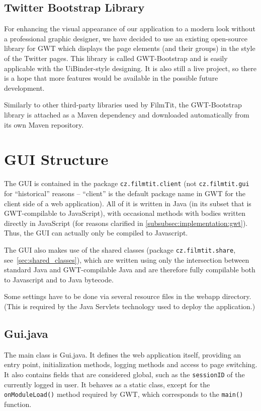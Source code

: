 \subsection{Twitter Bootstrap Library}
For enhancing the visual appearance of our application to a modern look without a professional graphic designer, we have decided to use an existing open-source library for GWT which displays the page elements (and their groups) in the style of the Twitter pages. This library is called GWT-Bootstrap and is easily applicable with the UiBinder-style designing. It is also still a live project, so there is a hope that more features would be available in the possible future development.

Similarly to other third-party libraries used by FilmTit, the GWT-Bootstrap library is attached as a Maven dependency and downloaded automatically from its own Maven repository.


\section{GUI Structure}

The GUI is contained in the package {\tt cz.filmtit.client} (not {\tt cz.filmtit.gui} for ``historical'' reasons -- ``client'' is the default package name in GWT for the client side of a web application). All of it is written in Java (in its subset that is GWT-compilable to JavaScript), with occasional methods with bodies written directly in JavaScript (for reasons clarified in \ref{subsubsec:implementation:gwt}). Thus, the GUI can actually only be compiled to Javascript.

The GUI also makes use of the shared classes (package {\tt cz.filmtit.share}, see~\ref{sec:shared_classes}), which are written using only the intersection between standard Java and GWT-compilable Java and are therefore fully compilable both to Javascript and to Java bytecode.

Some settings have to be done via several resource files in the webapp directory. (This is required by the Java Servlets technology used to deploy the application.)

\subsection{Gui.java}

The main class is Gui.java. It defines the web application itself, providing an entry point, initialization methods, logging methods and access to page switching. It also contains fields that are considered global, such as the {\tt sessionID} of the currently logged in user.
It behaves as a static class, except for the {\tt onModuleLoad()} method required by GWT, which corresponds to the {\tt main()} function.

